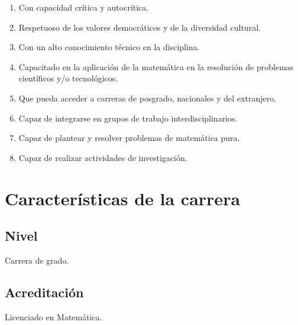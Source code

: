 \documentclass[a4paper, 12pt]{article}
\begin{document}
\begin{enumerate}

 \item Con capacidad crítica y autocrítica. 
 \item Respetuoso de los valores democráticos y de la diversidad cultural.
  \item Con un alto conocimiento técnico en la disciplina.
 \item Capacitado en la aplicación de la matemática en la
resolución de problemas científicos y/o tecnológicos.
\item Que pueda acceder a carreras de posgrado, 
nacionales y del extranjero.
\item Capaz de integrarse en grupos de trabajo interdisciplinarios.
\item Capaz de plantear y resolver problemas de matemática pura.
\item Capaz de realizar actividades de investigación.

\end{enumerate}








\section{Características de la carrera}


\subsection{Nivel} Carrera de grado.

\subsection{Acreditación} Licenciado en Matemática.
\end{document}
